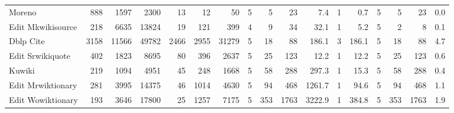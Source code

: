 \begin{landscape}
\begin{table}[htbp]
\begin{tabular}{l *{16}{r}}
    Moreno & 888 & 1597 & 2300 & 13 & 12 & 50 & 5 & 5 & 23 & 7.4 & 1 & 0.7 & 5 & 5 & 23 & 0.0 \\
    Edit Mkwikisource & 218 & 6635 & 13824 & 19 & 121 & 399 & 4 & 9 & 34 & 32.1 & 1 & 5.2 & 5 & 2 & 8 & 0.1 \\
    Dblp Cite & 3158 & 11566 & 49782 & 2466 & 2955 & 31279 & 5 & 18 & 88 & 186.1 & 3 & 186.1 & 5 & 18 & 88 & 4.7 \\
    Edit Srwikiquote & 402 & 1823 & 8695 & 80 & 396 & 2637 & 5 & 25 & 123 & 12.2 & 1 & 12.2 & 5 & 25 & 123 & 0.6 \\
    Kuwiki & 219 & 1094 & 4951 & 45 & 248 & 1668 & 5 & 58 & 288 & 297.3 & 1 & 15.3 & 5 & 58 & 288 & 0.4 \\
    Edit Mrwiktionary & 281 & 3995 & 14375 & 46 & 1014 & 4630 & 5 & 94 & 468 & 1261.7 & 1 & 94.6 & 5 & 94 & 468 & 1.1 \\
    Edit Wowiktionary & 193 & 3646 & 17800 & 25 & 1257 & 7175 & 5 & 353 & 1763 & 3222.9 & 1 & 384.8 & 5 & 353 & 1763 & 1.9 \\
    \bottomrule
  \end{tabular}
\end{table}
\end{landscape}
